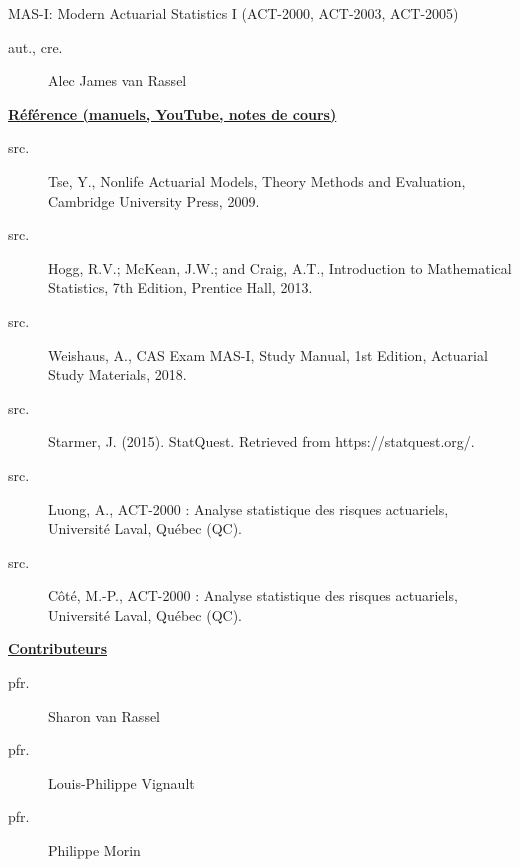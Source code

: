 \begin{contrib}{MAS-I: Modern Actuarial Statistics I (ACT-2000, ACT-2003, ACT-2005)}
\begin{description}
	\item[aut., cre.] Alec James van Rassel
\end{description}

\textbf{\underline{Référence (manuels, YouTube, notes de cours)}}
\begin{description}
	\item[src.]	Tse, Y., Nonlife Actuarial Models, Theory Methods and Evaluation, Cambridge University Press, 2009.
	\item[src.]	Hogg, R.V.; McKean, J.W.; and Craig, A.T., Introduction to Mathematical Statistics, 7th Edition, Prentice Hall, 2013.
	\item[src.]	Weishaus, A., CAS Exam MAS-I, Study Manual, 1st Edition, Actuarial Study Materials, 2018.
	\item[src.]	Starmer, J. (2015). StatQuest. Retrieved from https://statquest.org/.
	\item[src.]	Luong, A., ACT-2000 : Analyse statistique des risques actuariels, Université Laval, Québec (QC).
	\item[src.]	Côté, M.-P., ACT-2000 : Analyse statistique des risques actuariels, Université Laval, Québec (QC).
\end{description}

\textbf{\underline{Contributeurs}}
\begin{description}
	\item[pfr.]	Sharon van Rassel
	\item[pfr.]	Louis-Philippe Vignault
	\item[pfr.]	Philippe Morin
\end{description}
\end{contrib}
